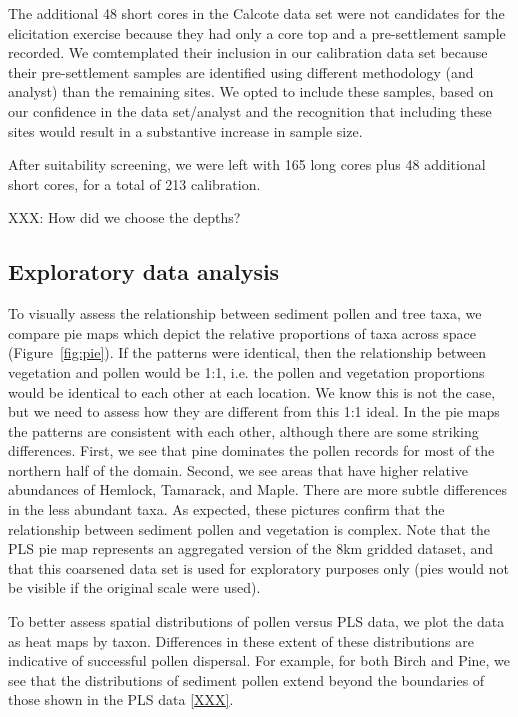 \documentclass[12pt]{article}
\begin{document}
The additional 48 short cores in the Calcote data set were not candidates for
the elicitation exercise because they had only a core top and a
pre-settlement sample recorded. We comtemplated their inclusion in our
calibration data set because their pre-settlement samples are
identified using different methodology (and analyst) than the
remaining sites. We opted to include these samples, based on our
confidence in the data set/analyst and the recognition that including
these sites would result in a substantive increase in sample size.

After suitability screening, we were left with 165 long cores plus 48
additional short cores, for a total of 213 calibration.

XXX: How did we choose the depths?

\subsection{Exploratory data analysis}

To visually assess the relationship between sediment pollen and tree
taxa, we compare pie maps which depict the relative proportions of
taxa across space (Figure~\ref{fig:pie}). If the patterns were
identical, then the relationship between vegetation and pollen would
be 1:1, i.e. the pollen and vegetation proportions would be identical
to each other at each location. We know this is not the case, but we
need to assess how they are different from this 1:1 ideal. In the pie
maps the patterns are consistent with each other, although there are
some striking differences. First, we see that pine dominates the
pollen records for most of the northern half of the domain. Second, we
see areas that have higher relative abundances of Hemlock, Tamarack,
and Maple. There are more subtle differences in the less abundant
taxa. As expected, these pictures confirm that the relationship
between sediment pollen and vegetation is complex. Note that the PLS
pie map represents an aggregated version of the 8km gridded dataset,
and that this coarsened data set is used for exploratory purposes only
(pies would not be visible if the original scale were used).

To better assess spatial distributions of pollen versus PLS data, we plot the data as heat maps by taxon. Differences in these extent of these distributions are indicative of successful pollen dispersal. For example, for both Birch and Pine, we see that the distributions of sediment pollen extend beyond the boundaries of those shown in the PLS data \ref{XXX}.
\end{document}
